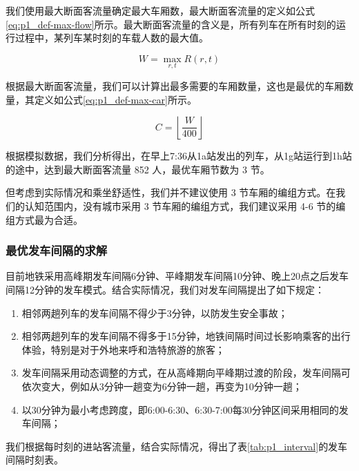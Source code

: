 \documentclass[12pt,a4paper]{mcmthesis}
\begin{document}
    我们使用最大断面客流量确定最大车厢数，最大断面客流量的定义如公式\ref{eq:p1_def-max-flow}所示。最大断面客流量的含义是，所有列车在所有时刻的运行过程中，某列车某时刻的车载人数的最大值。

    \begin{equation}
        W = \max_{r,t} R(r,t)
        \label{eq:p1_def-max-flow}
    \end{equation}

    根据最大断面客流量，我们可以计算出最多需要的车厢数量，这也是最优的车厢数量，其定义如公式\ref{eq:p1_def-max-car}所示。

    \begin{equation}
        C = \left\lfloor \frac{W}{400} \right\rfloor
        \label{eq:p1_def-max-car}
    \end{equation}

    根据模拟数据，我们分析得出，在早上7:36从1a站发出的列车，从1g站运行到1h站的途中，达到最大断面客流量 852 人，最优车厢节数为 3 节。

    但考虑到实际情况和乘坐舒适性，我们并不建议使用 3 节车厢的编组方式。在我们的认知范围内，没有城市采用 3 节车厢的编组方式，我们建议采用 4-6 节的编组方式最为合适。

    \subsubsection{最优发车间隔的求解}

    目前地铁采用高峰期发车间隔6分钟、平峰期发车间隔10分钟、晚上20点之后发车间隔12分钟的发车模式。结合实际情况，我们对发车间隔提出了如下规定：

    \begin{enumerate}
        \item 相邻两趟列车的发车间隔不得少于3分钟，以防发生安全事故；
        \item 相邻两趟列车的发车间隔不得多于15分钟，地铁间隔时间过长影响乘客的出行体验，特别是对于外地来呼和浩特旅游的旅客；
        \item 发车间隔采用动态调整的方式，在从高峰期向平峰期过渡的阶段，发车间隔可依次变大，例如从3分钟一趟变为6分钟一趟，再变为10分钟一趟；
        \item 以30分钟为最小考虑跨度，即6:00-6:30、6:30-7:00每30分钟区间采用相同的发车间隔；
    \end{enumerate}

    我们根据每时刻的进站客流量，结合实际情况，得出了表\ref{tab:p1_interval}的发车间隔时刻表。
\end{document}
